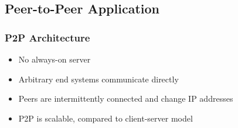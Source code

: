 \subsection{Peer-to-Peer Application}
\subsubsection{P2P Architecture}
\begin{itemize}
	\item No always-on server
	\item Arbitrary end systems communicate directly
	\item Peers are intermittently connected and change IP addresses
	\item P2P is scalable, compared to client-server model
\end{itemize}

